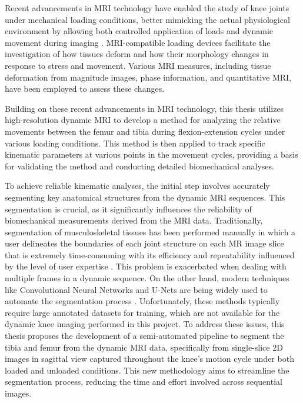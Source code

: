\documentclass{micro-econ-thesis}
\begin{document}
Recent advancements in MRI technology have enabled the study of knee joints under mechanical loading conditions, better mimicking the actual physiological environment by allowing both controlled application of loads and dynamic movement during imaging \autocites{conconi_-vivo_2023}{jogi_device_2022}. MRI-compatible loading devices facilitate the investigation of how tissues deform and how their morphology changes in response to stress and movement.  Various MRI measures, including tissue deformation from magnitude images, phase information, and quantitative MRI, have been employed to assess these changes. 

Building on these recent advancements in MRI technology, this thesis utilizes high-resolution dynamic MRI to develop a method for analyzing the relative movements between the femur and tibia during flexion-extension cycles under various loading conditions.  This method is then applied to track specific kinematic parameters at various points in the movement cycles, providing a basis for validating the method and conducting detailed biomechanical analyses.

To achieve reliable kinematic analyses, the initial step involves accurately segmenting key anatomical structures from the dynamic MRI sequences. This segmentation is crucial, as it significantly influences the reliability of biomechanical measurements derived from the MRI data. Traditionally, segmentation of musculoskeletal tissues has been performed manually in which a user delineates the boundaries of each joint structure on each MR image slice that is extremely time-consuming with its efficiency and repeatability influenced by the level of user expertise \parencite{mcwalter_use_2005}. This problem is exacerbated when dealing with multiple frames in a dynamic sequence. On the other hand, modern techniques like Convolutional Neural Networks and U-Nets are being widely used to automate the segmentation process \parencite{liu_deep_2018}. Unfortunately, these methods typically require large annotated datasets for training, which are not available for the dynamic knee imaging performed in this project. To address these issues, this thesis proposes the development of a semi-automated pipeline to segment the tibia and femur from the dynamic MRI data, specifically from single-slice 2D images in sagittal view captured throughout the knee's motion cycle under both loaded and unloaded conditions. This new methodology aims to streamline the segmentation process, reducing the time and effort involved across sequential images.
\end{document}

